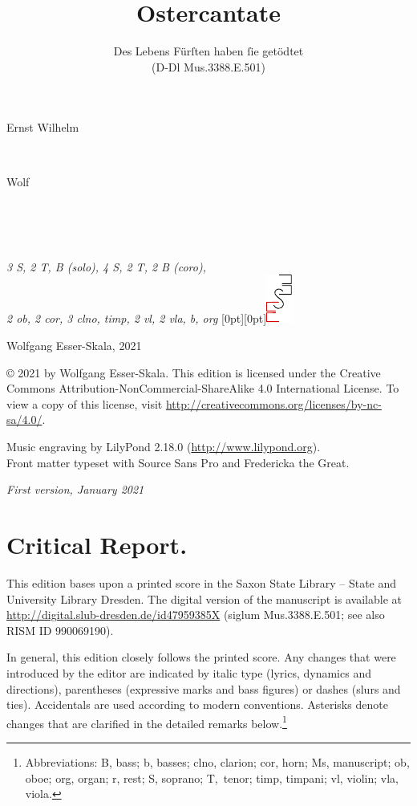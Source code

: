 \documentclass[parskip=full]{scrreprt}
\makeatletter
\DeclareRobustCommand{\sbseries}{\fontseries{sb}\selectfont}
\newcommand\fancytitlehead{
	\headingfont%
	\fontsize{80}{80}\selectfont\textcolor{black!80}{\@ifundefined{@shortname}{\@lastname}{\@shortname}.}\\[15pt]%
	\fontsize{60}{60}\selectfont\@ifundefined{@shorttitle}{\@title}{\@shorttitle}.%
}
\def\firstname#1{\def\@firstname{#1}}
\def\lastname#1{\def\@lastname{#1}}
\def\instrumentation#1{\def\@instrumentation{#1}}
\def\maketitle{%
\begin{titlepage}%
	\Large%
	{\@titlehead}%
	\vfill%
	{\strut\@firstname}\\%
	{\sbseries\color{oldred}\strut\@lastname}\\%
	{\strut\@namesuffix}%
	\vfill%
	{\sbseries\@title}\\%
	{\@subtitle}\\[\baselineskip]%
	{\itshape\@instrumentation}%
	\vfill%
	{\itshape\@parts}\hspace*{\fill}\raisebox{0pt}[0pt][0pt]{\includegraphics{ees_logo}}%
\end{titlepage}%
}
\newif\ifprintreport\printreportfalse
\makeatother
\begin{document}
\frenchspacing

\titlehead{\fancytitlehead}
\firstname{Ernst Wilhelm}
\lastname{Wolf}
\title{Ostercantate}
\subtitle{Des Lebens Fürſten haben ſie getödtet\\(D-Dl Mus.3388.E.501)}
\instrumentation{3 S, 2 T, B (solo), 4 S, 2 T, 2 B (coro),\\2 ob, 2 cor, 3 clno, timp, 2 vl, 2 vla, b, org}
\maketitle


\thispagestyle{empty}

\vspace*{\fill}

\hspace*{1em}Wolfgang Esser-Skala, 2021

© 2021 by Wolfgang Esser-Skala. This edition is licensed under the Creative Commons Attribution-NonCommercial-ShareAlike 4.0 International License. To view a copy of this license, visit \url{http://creativecommons.org/licenses/by-nc-sa/4.0/}. 

Music engraving by LilyPond 2.18.0 (\url{http://www.lilypond.org}).\\
Front matter typeset with Source Sans Pro and Fredericka the Great.

\textit{First version, January 2021}

\vspace*{2cm}

\ifprintreport
\chapter*{Critical Report.}

This edition bases upon a printed score in the Saxon State Library – State and University Library Dresden. The digital version of the manuscript is available at \url{http://digital.slub-dresden.de/id47959385X} (siglum Mus.3388.E.501; see also RISM ID 990069190).

In general, this edition closely follows the printed score. Any changes that were introduced by the editor are indicated by italic type (lyrics, dynamics and directions), parentheses (expressive marks and bass figures) or dashes (slurs and ties). Accidentals are used according to modern conventions. Asterisks denote changes that are clarified in the detailed remarks below.\footnote{Abbreviations: B, bass; b, basses; clno, clarion; cor, horn; Ms, manuscript; ob, oboe; org, organ; r, rest; S, soprano; T,~tenor; timp, timpani; vl, violin; vla, viola.}
\end{document}
